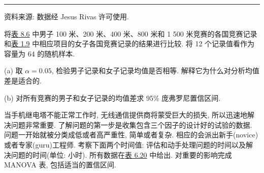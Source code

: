 \vspace{2pt}
\noindent\rule{\linewidth}{0.4pt}

\noindent\small 资料来源: 数据经 Jesus Rivas 许可使用.

\vspace{1em}
\quad 将\hyperref[tab:8.6]{表 8.6} 中男子 100 米、200 米、400 米、800 米和 1 500 米竞赛的各国竞赛记录和\hyperref[tab:1.9]{表 1.9} 中相应项目的女子各国竞赛记录的结果进行比较. 将 12 个记录值看作为容量为 64 的随机样本.

\noindent (a) 取 $\alpha=0.05$, 检验男子记录和女子记录均值是否相等. 解释它为什么对分析均值差是适合的.

\noindent (b) 对所有竞赛的男子和女子记录的均值差求 95\% 庞弗罗尼置信区间.

\quad 当手机继电塔不能正常工作时, 无线通信提供商将蒙受巨大的损失, 所以迅速地解决问题非常重要. 了解问题的第一步是收集包含三个因子的设计好的试验的数据. 问题一开始就被分类成低或者高严重性, 简单或者复杂. 相应的会派出新手(novice)或者专家(guru)工程师. 考察下面两个时间值: 评估和动手处理问题的时间以及解决问题的时间(单位: 小时). 所有数据在\hyperref[tab:6.20]{表 6.20} 中给出. 对重要的影响完成 MANOVA 表, 包括适当的置信区间.
